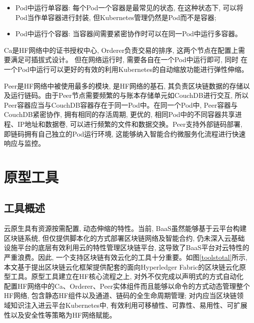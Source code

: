 \begin{itemize}[itemindent=2em]
    \item Pod中运行单容器: 每个Pod一个容器是最常见的状态, 在这种状态下, 可以将Pod当作单容器进行封装, 但Kubernetes管理仍然是Pod而不是容器;

    \item Pod中运行个容器: 当容器间需要紧密协作时可以在同一Pod中运行多容器。
\end{itemize}

Ca是HF网络中的证书授权中心, Orderer负责交易的排序, 这两个节点在配置上需要满足可插拔式设计。 但在网络运行时, 需要各自在一个Pod中运行即可, 同时 在一个Pod中运行可以更好的有效的利用Kubernetes的自动缩放功能进行弹性伸缩。

Peer是HF网络中被使用最多的模块, 是HF网络的基石, 其负责区块链数据的存储以及运行链码。由于Peer节点需要频繁的与账本存储单元如CouchDB进行交互, 所以Peer容器应当与CouchDB容器存在于同一Pod中。在同一个Pod中, Peer容器与CouchDB紧密协作, 拥有相同的存活周期, 更优的, 相同Pod中的不同容器共享进程、IP地址和数据卷, 可以进行频繁的文件和数据交换。Peer支持外部链码部署, 即链码拥有自己独立的Pod运行环境, 这能够纳入智能合约微服务化流程\cite{zhangfuli2021smartcontract}进行快速响应与监控。 

\section{原型工具}

\subsection{工具概述}

云原生具有资源按需配置, 动态伸缩的特性。当前, BaaS虽然能够基于云平台构建区块链系统, 但仅提供脚本化的方式部署区块链网络及智能合约, 仍未深入云基础设施平台的底层有效利用云的特性管理区块链平台, 这导致了BaaS平台对云特性的严重浪费。因此, 一个支持区块链有效云化的工具十分重要。如图\ref{toolstotal}所示, 本文基于提出区块链云化框架提供配套的面向Hyperledger Fabric的区块链云化原型工具。原型工具建立在HF核心流程之上, 对外不仅完成以声明式的方式自动化配置HF网络中的Ca、Orderer、Peer实体组件而且能够以命令的方式动态管理整个HF网络, 包含静态HF组件以及通道、链码的全生命周期管理; 对内应当区块链领域知识注入进云平台Kubernetes中, 有效利用可移植性、可靠性、易用性、可扩展性以及安全性等策略为HF网络赋能。

